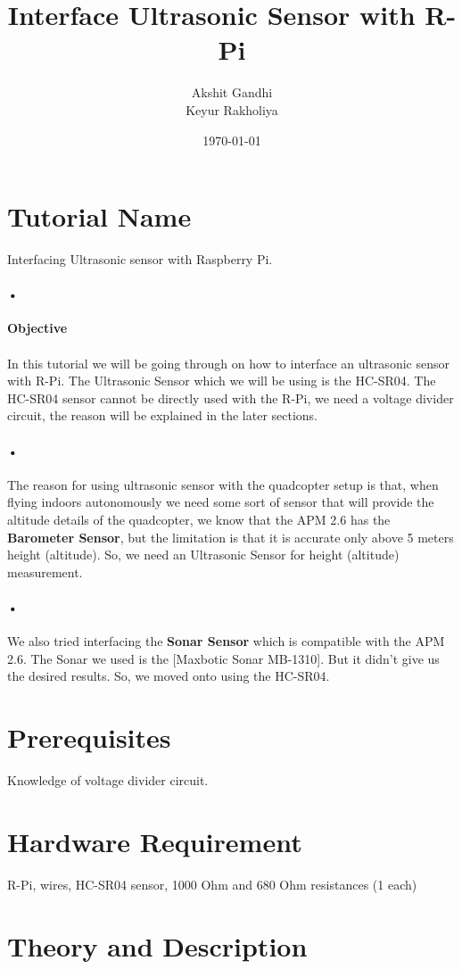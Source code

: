 \documentclass[11pt,a4paper]{article}
\title{Interface Ultrasonic Sensor with R-Pi}
\author{Akshit Gandhi \\ Keyur Rakholiya}
\date{\today}
\begin{document}
	\maketitle
	\newpage
	\tableofcontents
	\newpage
	\section{Tutorial Name}
		Interfacing Ultrasonic sensor with Raspberry Pi.
		\paragraph{•}
		\textbf{Objective}
		\paragraph{}In this tutorial we will be going through on how to interface an ultrasonic sensor with R-Pi. The Ultrasonic Sensor which we will be using is the HC-SR04. The HC-SR04 sensor cannot be directly used with the R-Pi, we need a voltage divider circuit, the reason will be explained in the later sections.
		\paragraph{•}The reason for using ultrasonic sensor with the quadcopter setup is that, when flying indoors autonomously we need some sort of sensor that will provide the altitude details of the quadcopter, we know that the APM 2.6 has the \textbf{Barometer Sensor}, but the limitation is that it is accurate only above 5 meters height (altitude). So, we need an Ultrasonic Sensor for height (altitude) measurement.
		\paragraph{•}We also tried interfacing the \textbf{Sonar Sensor} which is compatible with the APM 2.6. The Sonar we used is the [Maxbotic Sonar MB-1310]. But it didn't give us the desired results. So, we moved onto using the HC-SR04.
	\section{Prerequisites}
		Knowledge of voltage divider circuit.
	\section{Hardware Requirement}
		R-Pi, wires, HC-SR04 sensor, 1000 Ohm and 680 Ohm resistances (1 each)
	\section{Theory and Description}
\end{document}
